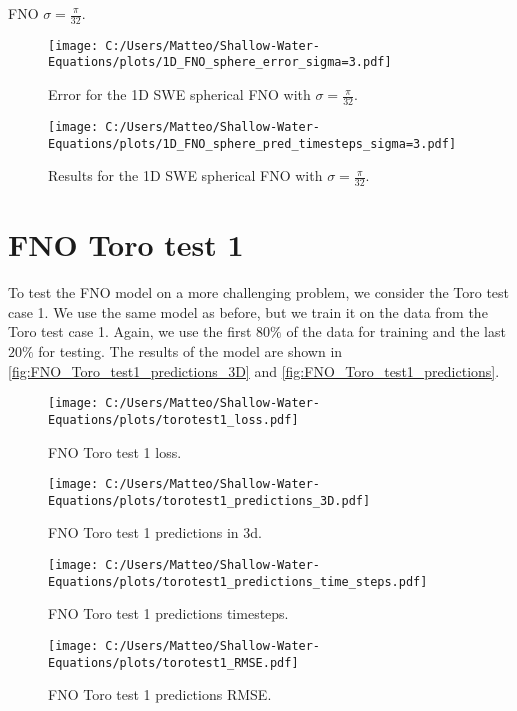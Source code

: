 FNO $\sigma = \frac{\pi}{32}$.
\begin{figure}[H]
    \centering
    \texttt{[image: C:/Users/Matteo/Shallow-Water-Equations/plots/1D\_FNO\_sphere\_error\_sigma=3.pdf]}
    \caption{Error for the 1D SWE spherical FNO with $\sigma = \frac{\pi}{32}$.}
\end{figure}

\begin{figure}[H]
    \centering
    \texttt{[image: C:/Users/Matteo/Shallow-Water-Equations/plots/1D\_FNO\_sphere\_pred\_timesteps\_sigma=3.pdf]}
    \caption{Results for the 1D SWE spherical FNO with $\sigma = \frac{\pi}{32}$.}
\end{figure}





\section{FNO Toro test 1}
To test the FNO model on a more challenging problem, we consider the Toro test case 1.
We use the same model as before, but we train it on the data from the Toro test case 1.
Again, we use the first $80\%$ of the data for training and the last $20\%$ for testing.
The results of the model are shown in \autoref{fig:FNO_Toro_test1_predictions_3D} and \autoref{fig:FNO_Toro_test1_predictions}.

\begin{figure}[H]
    \centering
    \texttt{[image: C:/Users/Matteo/Shallow-Water-Equations/plots/torotest1\_loss.pdf]}
    \caption{FNO Toro test 1 loss.}\label{fig:FNO_Toro_test1_loss}
\end{figure}

\begin{figure}[H]
    \centering
    \texttt{[image: C:/Users/Matteo/Shallow-Water-Equations/plots/torotest1\_predictions\_3D.pdf]}
    \caption{FNO Toro test 1 predictions in 3d.}\label{fig:FNO_Toro_test1_predictions_3D}
\end{figure}


\begin{figure}[H]
    \centering
    \texttt{[image: C:/Users/Matteo/Shallow-Water-Equations/plots/torotest1\_predictions\_time\_steps.pdf]}
    \caption{FNO Toro test 1 predictions timesteps.}\label{fig:FNO_Toro_test1_predictions_time_steps}
\end{figure}


\begin{figure}[H]
    \centering
    \texttt{[image: C:/Users/Matteo/Shallow-Water-Equations/plots/torotest1\_RMSE.pdf]}
    \caption{FNO Toro test 1 predictions RMSE.}\label{fig:FNO_Toro_test1_rmse}
\end{figure}



